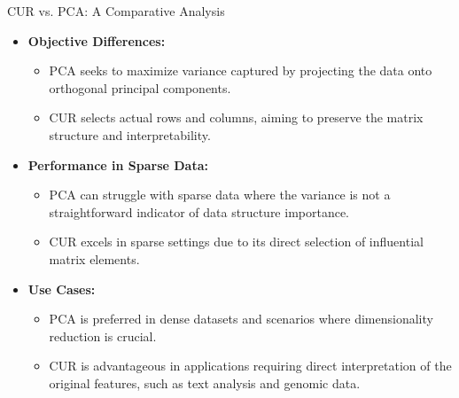 \documentclass[pdf]{beamer}
\begin{document}
\begin{frame}{CUR vs. PCA: A Comparative Analysis}
    \begin{itemize}
        \item \textbf{Objective Differences:}
            \begin{itemize}
                \item PCA seeks to maximize variance captured by projecting the data onto orthogonal principal components.
                \item CUR selects actual rows and columns, aiming to preserve the matrix structure and interpretability.
            \end{itemize}
        \item \textbf{Performance in Sparse Data:}
            \begin{itemize}
                \item PCA can struggle with sparse data where the variance is not a straightforward indicator of data structure importance.
                \item CUR excels in sparse settings due to its direct selection of influential matrix elements.
            \end{itemize}
        \item \textbf{Use Cases:}
            \begin{itemize}
                \item PCA is preferred in dense datasets and scenarios where dimensionality reduction is crucial.
                \item CUR is advantageous in applications requiring direct interpretation of the original features, such as text analysis and genomic data.
            \end{itemize}
    \end{itemize}
\end{frame}
\end{document}
